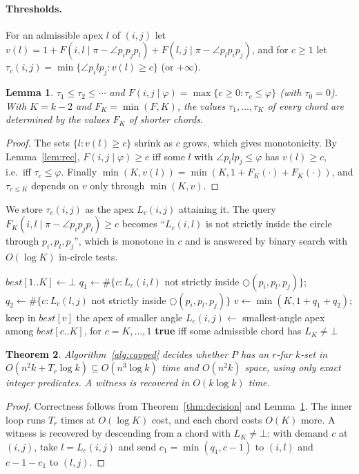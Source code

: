 \documentclass[11pt,a4paper]{article}
\newtheorem{theorem}{Theorem}
\newtheorem{lemma}[theorem]{Lemma}
\theoremstyle{definition}
\newcommand{\arc}[2]{P(#1,#2)}
\newcommand{\ang}{\angle}
\begin{document}
\paragraph{Thresholds.} For an admissible apex $l$ of $(i,j)$ let
$v(l)=1+F(i,l\mid\pi-\ang p_ip_jp_l)+F(l,j\mid\pi-\ang p_lp_ip_j)$, and for
$c\ge1$ let $\tau_c(i,j)=\min\{\ang p_ilp_j: v(l)\ge c\}$ (or $+\infty$).

\begin{lemma}\label{lem:thresholds}
$\tau_1\le\tau_2\le\cdots$ and $F(i,j\mid\varphi)=\max\{c\ge0:\tau_c\le\varphi\}$
(with $\tau_0=0$). With $K=k-2$ and $F_K=\min(F,K)$, the values
$\tau_1,\dots,\tau_K$ of every chord are determined by the values $F_K$ of
shorter chords.
\end{lemma}
\begin{proof}
The sets $\{l:v(l)\ge c\}$ shrink as $c$ grows, which gives monotonicity. By
Lemma~\ref{lem:rec}, $F(i,j\mid\varphi)\ge c$ iff some $l$ with
$\ang p_ilp_j\le\varphi$ has $v(l)\ge c$, i.e.\ iff $\tau_c\le\varphi$. Finally
$\min(K,v(l))=\min(K,1+F_K(\cdot)+F_K(\cdot))$, and $\tau_{c\le K}$ depends on
$v$ only through $\min(K,v)$.
\end{proof}

We store $\tau_c(i,j)$ as the apex $L_c(i,j)$ attaining it. The query
$F_K(i,l\mid\pi-\ang p_ip_jp_l)\ge c$ becomes ``$L_c(i,l)$ is not strictly
inside the circle through $p_i,p_l,p_j$'', which is monotone in $c$ and is
answered by binary search with $O(\log K)$ in-circle tests.

\begin{algorithm}[t]
\caption{\textsc{CappedDecision}$(P,k,r)$}\label{alg:capped}
\begin{algorithmic}[1]
  \State $best[1..K]\gets\bot$
  \For{each admissible apex $l\in\arc ij$}
    \State $q_1\gets\#\{c: L_c(i,l)$ not strictly inside $\bigcirc(p_i,p_l,p_j)\}$;\;
           $q_2\gets\#\{c: L_c(l,j)$ not strictly inside $\bigcirc(p_i,p_l,p_j)\}$
    \State $v\gets\min(K,1+q_1+q_2)$; keep in $best[v]$ the apex of smaller angle
  \EndFor
  \State $L_c(i,j)\gets$ smallest-angle apex among $best[c..K]$, for $c=K,\dots,1$
\EndFor
\State \Return \textbf{true} iff some admissible chord has $L_K\ne\bot$
\end{algorithmic}
\end{algorithm}

\begin{theorem}\label{thm:capped}
Algorithm~\ref{alg:capped} decides whether $P$ has an $r$-far $k$-set in
$O(n^2k+T_r\log k)\subseteq O(n^3\log k)$ time and $O(n^2k)$ space, using
only exact integer predicates. A witness is recovered in $O(k\log k)$ time.
\end{theorem}
\begin{proof}
Correctness follows from Theorem~\ref{thm:decision} and
Lemma~\ref{lem:thresholds}. The inner loop runs $T_r$ times at $O(\log K)$
cost, and each chord costs $O(K)$ more. A witness is recovered by descending
from a chord with $L_K\ne\bot$: with demand $c$ at $(i,j)$, take
$l=L_c(i,j)$ and send $c_1=\min(q_1,c-1)$ to $(i,l)$ and $c-1-c_1$ to $(l,j)$.
\end{proof}
\end{document}
